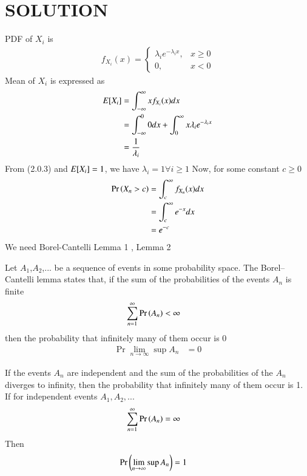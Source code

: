 \documentclass[journal,12pt,twocolumn]{IEEEtran}
\begin{document}
\section{SOLUTION}
PDF of $X_i$ is
\begin{align}
    f_{X_i}(x)=\begin{cases}\lambda_i e^{-\lambda_i x}, &x\geq 0\\
                0, &x<0\nonumber
    \end{cases}    
\end{align} 
Mean of $X_i$ is expressed as
\begin{align}
    E[ X_i ]&=\int_{-\infty}^{\infty}x f_{X_i}(x) dx\\
              &=\int_{-\infty}^{0}0 dx + \int_{0}^{\infty}x \lambda_i e^{-\lambda_i x}\\
              &=\frac{1}{\lambda_i}
\end{align}
From (2.0.3) and $E[ X_i ]=1$, we have $\lambda_i=1 \forall  i \geq1$
Now, for some constant $c\geq0$
\begin{align}
    \Pr\left(X_n>c\right)&=\int_{c}^{\infty}f_{X_n}(x)dx\\
              &=\int_{c}^{\infty}e^{-x}dx\\
              &=e^{-c}
\end{align}
We need Borel-Cantelli Lemma 1 , Lemma 2
\begin{lemma}\label{Lemma1}
Let $A_1$,$A_2$,... be a sequence of events in some probability space. The Borel–Cantelli lemma states that, if the sum of the probabilities of the events $A_n$ is finite
\begin{align}
    \sum_{n=1}^{\infty}\Pr\left(A_n\right)&<\infty
\end{align}
then the probability that infinitely many of them occur is 0
\begin{align}
    \Pr{\lim_{n \rightarrow \infty}\sup A_n}&=0
\end{align}
\end{lemma}
\begin{lemma}\label{Lemma2}
If the events $A_n$ are independent and the sum of the probabilities of the $A_n$ diverges to infinity, then the probability that infinitely many of them occur is 1.
If for independent events $A_1,A_2,...$
\begin{align}
    \sum_{n=1}^{\infty}\Pr\left(A_n\right)&=\infty
\end{align}
Then
\begin{align}
    \Pr\left(\lim_{n \rightarrow \infty}\sup A_n\right)&=1
\end{align}
\end{lemma}
\end{document}
